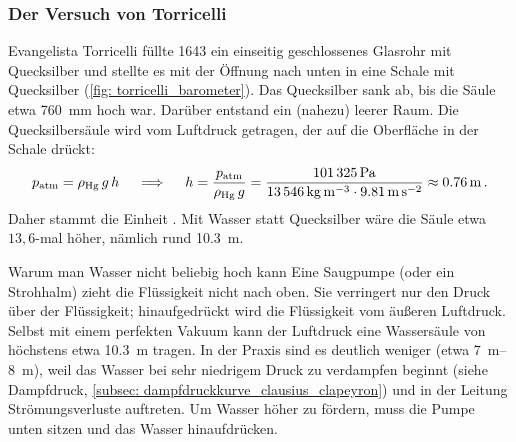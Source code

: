\subsubsection*{Der Versuch von Torricelli}
Evangelista Torricelli füllte 1643 ein einseitig geschlossenes Glasrohr mit Quecksilber und stellte es mit der Öffnung nach unten in eine Schale mit Quecksilber (\cref{fig: torricelli_barometer}). Das Quecksilber sank ab, bis die Säule etwa \SI{760}{\milli\meter} hoch war. Darüber entstand ein (nahezu) leerer Raum. Die Quecksilbersäule wird vom Luftdruck getragen, der auf die Oberfläche in der Schale drückt:
\begin{equation}
    p_{\mathrm{atm}} = \rho_\text{Hg} \, g \, h \quad \implies \quad h = \frac{p_{\mathrm{atm}}}{\rho_\text{Hg}\, g} = \frac{\SI{101325}{\pascal}}{\SI{13546}{\kilogram\per\meter\cubed} \cdot \SI{9.81}{\meter\per\second\squared}} \approx \SI{0.76}{\meter} \,.
\end{equation}
Daher stammt die Einheit . Mit Wasser statt Quecksilber wäre die Säule etwa $13{,}6$-mal höher, nämlich rund \SI{10.3}{\meter}.

\begin{importantbox}[]{Warum man Wasser nicht beliebig hoch  kann}
    Eine Saugpumpe (oder ein Strohhalm) zieht die Flüssigkeit nicht nach oben. Sie verringert nur den Druck über der Flüssigkeit; hinaufgedrückt wird die Flüssigkeit vom äußeren Luftdruck. Selbst mit einem perfekten Vakuum kann der Luftdruck eine Wassersäule von höchstens etwa \SI{10.3}{\meter} tragen. In der Praxis sind es deutlich weniger (etwa \SIrange{7}{8}{\meter}), weil das Wasser bei sehr niedrigem Druck zu verdampfen beginnt (siehe Dampfdruck, \cref{subsec: dampfdruckkurve_clausius_clapeyron}) und in der Leitung Strömungsverluste auftreten. Um Wasser höher zu fördern, muss die Pumpe unten sitzen und das Wasser hinaufdrücken.
\end{importantbox}

